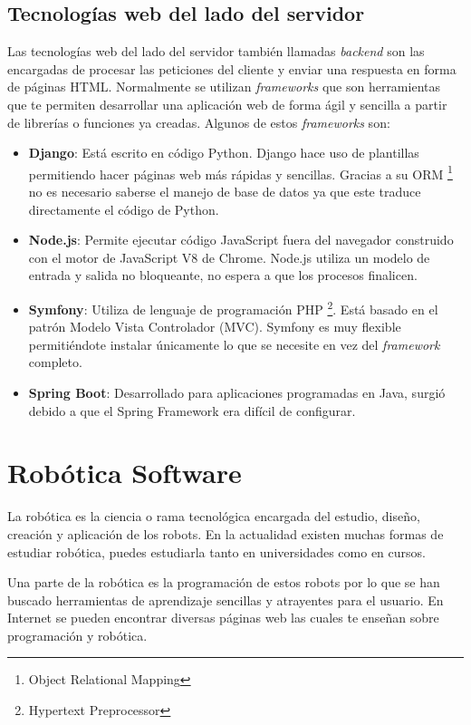 \subsection{Tecnologías web del lado del servidor}
Las tecnologías web del lado del servidor también llamadas \textit{backend }son las encargadas de procesar las peticiones del cliente y enviar una respuesta en forma de páginas HTML. Normalmente se utilizan \textit{frameworks }que son herramientas que te permiten desarrollar una aplicación web de forma ágil y sencilla a partir de librerías o funciones ya creadas. Algunos de estos \textit{frameworks} son:

\begin{itemize}
  \item \textbf{Django}: Está escrito en código Python. Django hace uso de plantillas permitiendo hacer páginas web más rápidas y sencillas. Gracias a su ORM \footnote{Object Relational Mapping
} no es necesario saberse el manejo de base de datos ya que este traduce directamente el código de Python.
  \item \textbf{Node.js}: Permite ejecutar código JavaScript fuera del navegador construido con el motor de JavaScript V8 de Chrome. Node.js utiliza un modelo de entrada y salida no bloqueante, no espera a que los procesos finalicen.
  \item \textbf{Symfony}: Utiliza de lenguaje de programación PHP \footnote{Hypertext Preprocessor}. Está basado en el patrón Modelo Vista Controlador (MVC). Symfony es muy flexible permitiéndote instalar únicamente lo que se necesite en vez del \textit{framework} completo.
  \item \textbf{Spring Boot}: Desarrollado para aplicaciones programadas en Java, surgió debido a que el Spring Framework era difícil de configurar. 
\end{itemize}

\section{Robótica Software }
La robótica es la ciencia o rama tecnológica encargada del estudio, diseño, creación y aplicación de los robots. En la actualidad existen muchas formas de estudiar robótica, puedes estudiarla tanto en universidades como en cursos.

Una parte de la robótica es la programación de estos robots por lo que se han buscado herramientas de aprendizaje sencillas y atrayentes para el usuario. En Internet se pueden encontrar diversas páginas web las cuales te enseñan sobre programación y robótica.

